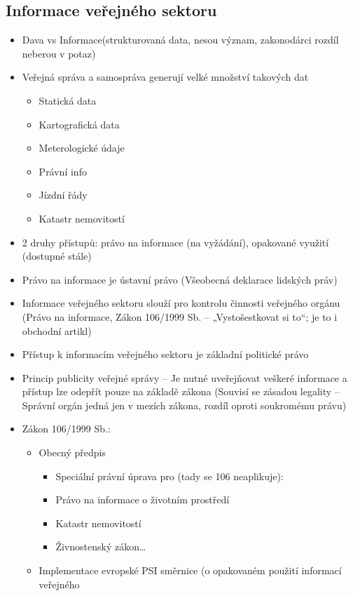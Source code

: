 \subsection{Informace veřejného sektoru}
\begin{itemize}
    \item Dava vs Informace(strukturovaná data, nesou význam, zakonodárci rozdíl neberou v potaz)
    \item Veřejná správa a samospráva generují velké množství takových dat
    \begin{itemize}
        \item Statická data
        \item Kartografická data
        \item Meterologické údaje
        \item Právní info
        \item Jízdní řády
        \item Katastr nemovitostí
    \end{itemize}
    \item 2 druhy přístupů: právo na informace (na vyžádání), opakované využití (dostupné stále)
    \item Právo na informace je ústavní právo (Všeobecná deklarace lidských práv)
    \item Informace veřejného sektoru slouží pro kontrolu činnosti veřejného orgánu (Právo na
informace, Zákon 106/1999 Sb. – „Vystošestkovat si to“; je to i obchodní artikl)
    \item Přístup k informacím veřejného sektoru je základní politické právo
    \item Princip publicity veřejné správy – Je nutné uveřejňovat veškeré informace a přístup lze
odepřít pouze na základě zákona (Souvisí se zásadou legality – Správní orgán jedná jen
v mezích zákona, rozdíl oproti soukromému právu)
\item Zákon 106/1999 Sb.:
\begin{itemize}
    \item Obecný předpis
    \begin{itemize}
        \item Speciální právní úprava pro (tady se 106 neaplikuje):
        \item Právo na informace o životním prostředí
        \item Katastr nemovitostí
        \item Živnostenský zákon…
    \end{itemize}
    \item Implementace evropské PSI směrnice (o opakovaném použití informací veřejného

\end{itemize}
\end{itemize}
